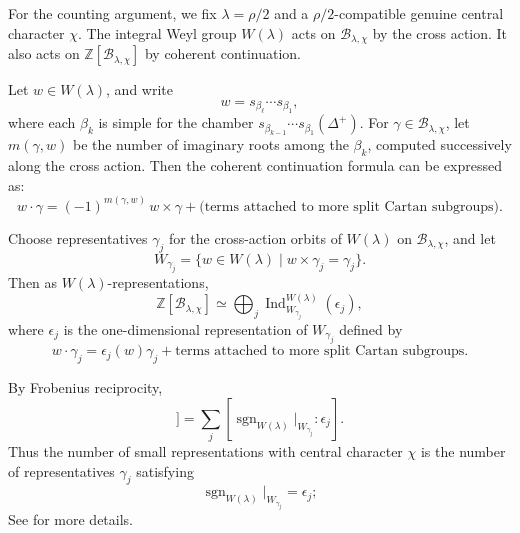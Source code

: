 \documentclass{amsart}
\newcommand{\bbZ}{{\mathbb Z}}
\theoremstyle{definition}
\newcommand{\calB}{{\mathcal{B}}}
\begin{document}
For the counting argument, we fix $\lambda=\rho/2$ and a $\rho/2$-compatible genuine central character $\chi$. The integral Weyl group $W(\lambda)$ acts on $\calB_{\lambda,\chi}$ by the cross action. It also acts on $\bbZ[\calB_{\lambda,\chi}]$ by coherent continuation.

Let $w\in W(\lambda)$, and write
\begin{equation}\label{e:sim-refl}
w=s_{\beta_\ell}\cdots s_{\beta_1},
\end{equation}
where each $\beta_k$ is simple for the chamber
$s_{\beta_{k-1}}\cdots s_{\beta_1}(\Delta^+)$.
For $\gamma\in\calB_{\lambda,\chi}$, let $m(\gamma,w)$ be the number of imaginary roots among the $\beta_k$, computed successively along the cross action. Then the coherent continuation formula can be expressed as: 
\begin{equation}\label{e:cohcon}
w\cdot \gamma
=
(-1)^{m(\gamma,w)}\,w\times\gamma
+
\text{(terms attached to more split Cartan subgroups)}.
\end{equation}


Choose representatives $\gamma_j$ for the cross-action orbits of $W(\lambda)$ on $\calB_{\lambda,\chi}$, and let
\begin{equation*}
W_{\gamma_j}
=
\{w\in W(\lambda)\mid w\times\gamma_j=\gamma_j\}.
\end{equation*}
Then as $W(\lambda)$-representations, 
\begin{equation}\label{e:ind}
\bbZ[\calB_{\lambda,\chi}]
\simeq
\bigoplus_j
\operatorname{Ind}_{W_{\gamma_j}}^{W(\lambda)}(\epsilon_j),
\end{equation}
where $\epsilon_j$ is the one-dimensional representation of $W_{\gamma_j}$ defined by
\begin{equation*}
w\cdot\gamma_j
=
\epsilon_j(w)\gamma_j
+
\text{terms attached to more split Cartan subgroups}.
\end{equation*}


By Frobenius reciprocity,
\begin{equation*}
[\operatorname{sgn}_{W(\lambda)}:\bbZ[\calB_{\lambda,\chi}]]
=
\sum_j
[
\operatorname{sgn}_{W(\lambda)}|_{W_{\gamma_j}}:\epsilon_j
].
\end{equation*}
Thus the number of small representations with central character $\chi$ is the number of representatives $\gamma_j$ satisfying
\begin{equation}\label{e:key}
\operatorname{sgn}_{W(\lambda)}|_{W_{\gamma_j}}
=
\epsilon_j;
\end{equation}
See \cite{Ts19} for more details. 
\medskip
\end{document}
